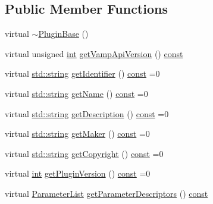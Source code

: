 \subsection*{Public Member Functions}
\begin{DoxyCompactItemize}
\item 
virtual \hyperlink{class_vamp_1_1_plugin_base_a3773b37c658cf22d7f135c575a28f5c5}{$\sim$\+Plugin\+Base} ()
\item 
virtual unsigned \hyperlink{xmltok_8h_a5a0d4a5641ce434f1d23533f2b2e6653}{int} \hyperlink{class_vamp_1_1_plugin_base_a8fd2c48291c64b790f0efb8948508dcf}{get\+Vamp\+Api\+Version} () \hyperlink{getopt1_8c_a2c212835823e3c54a8ab6d95c652660e}{const} 
\item 
virtual \hyperlink{test__lib_f_l_a_c_2format_8c_ab02026ad0de9fb6c1b4233deb0a00c75}{std\+::string} \hyperlink{class_vamp_1_1_plugin_base_a0d1947bb05097718af83eefe7a1910cd}{get\+Identifier} () \hyperlink{getopt1_8c_a2c212835823e3c54a8ab6d95c652660e}{const}  =0
\item 
virtual \hyperlink{test__lib_f_l_a_c_2format_8c_ab02026ad0de9fb6c1b4233deb0a00c75}{std\+::string} \hyperlink{class_vamp_1_1_plugin_base_ada907f5fa10e503005bdf445f03f7adf}{get\+Name} () \hyperlink{getopt1_8c_a2c212835823e3c54a8ab6d95c652660e}{const}  =0
\item 
virtual \hyperlink{test__lib_f_l_a_c_2format_8c_ab02026ad0de9fb6c1b4233deb0a00c75}{std\+::string} \hyperlink{class_vamp_1_1_plugin_base_ab210db7ce8f2eaa6cfddf2c7e64555ad}{get\+Description} () \hyperlink{getopt1_8c_a2c212835823e3c54a8ab6d95c652660e}{const}  =0
\item 
virtual \hyperlink{test__lib_f_l_a_c_2format_8c_ab02026ad0de9fb6c1b4233deb0a00c75}{std\+::string} \hyperlink{class_vamp_1_1_plugin_base_a6d54bf690c421c7865dccdfd0dda23a8}{get\+Maker} () \hyperlink{getopt1_8c_a2c212835823e3c54a8ab6d95c652660e}{const}  =0
\item 
virtual \hyperlink{test__lib_f_l_a_c_2format_8c_ab02026ad0de9fb6c1b4233deb0a00c75}{std\+::string} \hyperlink{class_vamp_1_1_plugin_base_ae20b78e081f13a5d71b17e89e05d48e2}{get\+Copyright} () \hyperlink{getopt1_8c_a2c212835823e3c54a8ab6d95c652660e}{const}  =0
\item 
virtual \hyperlink{xmltok_8h_a5a0d4a5641ce434f1d23533f2b2e6653}{int} \hyperlink{class_vamp_1_1_plugin_base_a315c884db72db5cef0891eaccb6d12cc}{get\+Plugin\+Version} () \hyperlink{getopt1_8c_a2c212835823e3c54a8ab6d95c652660e}{const}  =0
\item 
virtual \hyperlink{class_vamp_1_1_plugin_base_a3b6bb4bbd86affe1ca9deceea1aad4f8}{Parameter\+List} \hyperlink{class_vamp_1_1_plugin_base_aac3e49b3b66cacfbb768dfdf07444f21}{get\+Parameter\+Descriptors} () \hyperlink{getopt1_8c_a2c212835823e3c54a8ab6d95c652660e}{const} 

\end{DoxyCompactItemize}
